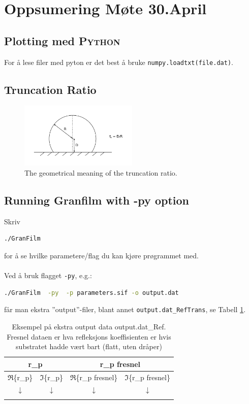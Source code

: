 \section{Oppsumering Møte 30.April}
\subsection{Plotting med \textsc{Python}}
For å lese filer med pyton er det best å bruke \texttt{numpy.loadtxt(file.dat)}.


\subsection{Truncation Ratio}
%
\begin{figure}[h!]
  \centering
   \includegraphics[width=0.5\textwidth]{truncationRatio.pdf}
   \caption{
   The geometrical meaning of the truncation ratio.
   }
   \label{fig:energyComparison}
\end{figure}
%


\subsection{Running Granfilm with -py option}
Skriv 
\begin{lstlisting}[style=FormattedNumber, language=bash]
./GranFilm
\end{lstlisting}
for å se hvilke parametere/flag du kan kjøre prøgrammet med.
\\
\\
Ved å bruk flagget \texttt{-py}, e.g.:
\begin{lstlisting}[style=FormattedNumber, language=bash]
./GranFilm  -py  -p parameters.sif -o output.dat
\end{lstlisting}
får man ekstra ''output''-filer, blant annet \texttt{output.dat\_RefTrans}, se Tabell \ref{tab1}.
%
\begin{table}[htbp]
   \caption{Eksempel på ekstra output data output.dat\_Ref. Fresnel dataen er 
   hva refleksjons koeffisienten er hvis substratet hadde vært bart (flatt, uten dråper)}
\centering
\begin{tabular}{ c c c c }
\hline
 \multicolumn{2}{c}{r\_p}         &  \multicolumn{2}{c}{r\_p fresnel} \\
\hline
$\Re$\{r\_p\}  &  $\Im$\{r\_p\} & $\Re$\{r\_p fresnel\}   & $\Im$\{r\_p fresnel\}  \\
$\downarrow$ & $\downarrow$ &  $\downarrow$         &    $\downarrow$ \\
            &              &              &              \\
\hline
\end{tabular}
\label{tab1}
\end{table}
%
